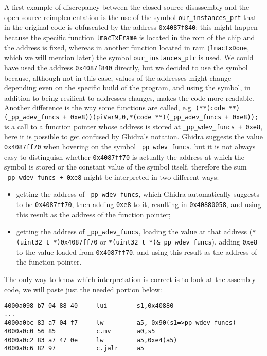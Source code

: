 A first example of discrepancy between the closed source disassembly and the
open source reimplementation is the use of the symbol \texttt{our\_instances\_prt}
that in the original code is obfuscated by the address \texttt{0x4087f840};
this might happen because the specific function \texttt{lmacTxFrame} is
located in the rom of the chip and the address is fixed, whereas 
in another function located in ram (\texttt{lmacTxDone}, which we will mention later) the symbol
\texttt{our\_instances\_ptr} is used.
We could have used the address \texttt{0x4087f840} directly, but we decided to use the symbol because,
although not in this case, values of the addresses might change depending even on the specific
build of the program, and using the symbol, in addition to being resilient to addresses changes,
makes the code more readable.
Another difference is the way some functions are called,
e.g. \texttt{(**(code **)(\_pp\_wdev\_funcs + 0xe8))(piVar9,0,*(code **)(\_pp\_wdev\_funcs + 0xe8));}
is a call to a function pointer whose address is stored at \texttt{\_pp\_wdev\_funcs + 0xe8},
here it is possible to get confused by Ghidra's notation. 
Ghidra suggests the value \texttt{0x4087ff70} when hovering on
the symbol \texttt{\_pp\_wdev\_funcs}, but it is not
always easy to distinguish whether \texttt{0x4087ff70} is actually
the address at which the symbol is stored or the constant
value of the symbol itself, therefore the sum \texttt{\_pp\_wdev\_funcs + 0xe8}
might be interpreted in two different ways:
\begin{itemize}
\item getting the address of \texttt{\_pp\_wdev\_funcs},
which Ghidra automatically suggests to be \texttt{0x4087ff70}, then adding
\texttt{0xe8} to it, resulting in \texttt{0x40880058}, and using this result as
the address of the function pointer;
\item getting the address of \texttt{\_pp\_wdev\_funcs}, loading the value at that address
(\texttt{*(uint32\_t *)0x4087ff70} or \texttt{*(uint32\_t *)\&\_pp\_wdev\_funcs}),
adding \texttt{0xe8} to the value loaded from \texttt{0x4087ff70}, and using this result as
the address of the function pointer.
\end{itemize}
The only way to know which interpretation is correct is to look at the assembly code,
we will paste just the needed portion below:

\begin{lstlisting}
4000a098 b7 04 88 40     lui        s1,0x40880
...
4000a0bc 83 a7 04 f7     lw         a5,-0x90(s1=>pp_wdev_funcs)
4000a0c0 56 85           c.mv       a0,s5
4000a0c2 83 a7 47 0e     lw         a5,0xe4(a5)
4000a0c6 82 97           c.jalr     a5
\end{lstlisting}

